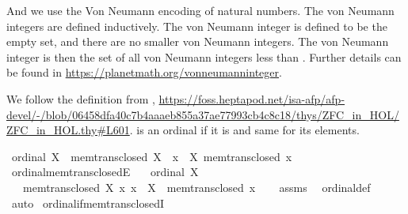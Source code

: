 \begin{isabellebody}
\begin{isamarkuptext}
And we use the Von Neumann encoding of natural numbers. The von Neumann integers
are defined inductively. The von Neumann integer  is defined to be the empty set, 
and there are no smaller von Neumann integers. The von Neumann integer  is then the set of 
all von Neumann integers less than . Further details can be found in
\url{https://planetmath.org/vonneumanninteger}.%
\end{isamarkuptext}\isamarkuptrue%
%
\isadelimdocument
%
\endisadelimdocument
%
\isatagdocument
%
\isamarkuptrue%
%
\endisatagdocument
{\isafolddocument}%
%
\isadelimdocument
%
\endisadelimdocument
%
\begin{isamarkuptext}%
We follow the definition from \cite{ZFC_in_HOL_AFP}, \url{https://foss.heptapod.net/isa-afp/afp-devel/-/blob/06458dfa40c7b4aaaeb855a37ae77993cb4c8c18/thys/ZFC_in_HOL/ZFC_in_HOL.thy\#L601}.
  is an ordinal if it is  and same for its elements.%
\end{isamarkuptext}\isamarkuptrue%
\isamarkupfalse%
\ {\isachardoublequoteopen}ordinal\ X\ {\isasymequiv}\ mem{\isacharunderscore}{\kern0pt}trans{\isacharunderscore}{\kern0pt}closed\ X\ {\isasymand}\ {\isacharparenleft}{\kern0pt}{\isasymforall}x\ {\isasymin}\ X{\isachardot}{\kern0pt}\ mem{\isacharunderscore}{\kern0pt}trans{\isacharunderscore}{\kern0pt}closed\ x{\isacharparenright}{\kern0pt}{\isachardoublequoteclose}\isanewline
\isanewline
{}\isamarkupfalse%
\ ordinal{\isacharunderscore}{\kern0pt}mem{\isacharunderscore}{\kern0pt}trans{\isacharunderscore}{\kern0pt}closedE{\isacharcolon}{\kern0pt}\isanewline
\ \ \ {\isachardoublequoteopen}ordinal\ X{\isachardoublequoteclose}\isanewline
\ \ \ {\isachardoublequoteopen}mem{\isacharunderscore}{\kern0pt}trans{\isacharunderscore}{\kern0pt}closed\ X{\isachardoublequoteclose}\ {\isachardoublequoteopen}{\isasymAnd}x{\isachardot}{\kern0pt}\ x\ {\isasymin}\ X\ {\isasymLongrightarrow}\ mem{\isacharunderscore}{\kern0pt}trans{\isacharunderscore}{\kern0pt}closed\ x{\isachardoublequoteclose}\isanewline
%
\isadelimproof
\ \ %
\endisadelimproof
%
\isatagproof
{}\isamarkupfalse%
\ assms\ \isamarkupfalse%
\ ordinal{\isacharunderscore}{\kern0pt}def\ \isamarkupfalse%
\ auto%
\endisatagproof
{\isafoldproof}%
%
\isadelimproof
\isanewline
%
\endisadelimproof
\isanewline
{}\isamarkupfalse%
\ ordinal{\isacharunderscore}{\kern0pt}if{\isacharunderscore}{\kern0pt}mem{\isacharunderscore}{\kern0pt}trans{\isacharunderscore}{\kern0pt}closedI{\isacharcolon}{\kern0pt}\isanewline

\end{isabellebody}
